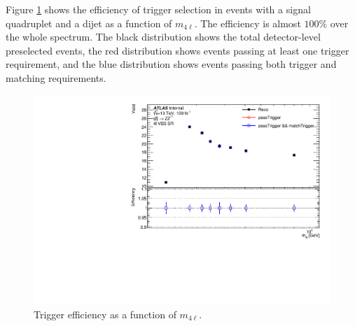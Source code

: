 Figure \ref{fig:Trigger} shows the efficiency of trigger selection in events with a signal quadruplet and a dijet as a function of $m_{4\ell}$. The efficiency is almost $100\%$ over the whole spectrum. The black distribution shows the total detector-level preselected events, the red distribution shows events passing at least one trigger requirement, and the blue distribution shows events passing both trigger and matching requirements. 
\begin{figure}
    \centering
    \includegraphics[width=.8\linewidth]{figures/AnalysisOverview/TriggerEfficiency.pdf}
    \caption{ Trigger efficiency as a function of $m_{4\ell}$.\label{fig:Trigger}}
\end{figure}